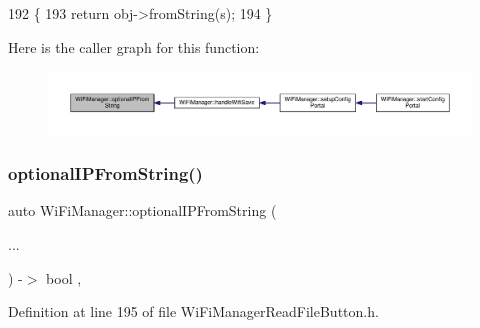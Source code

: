 \begin{DoxyCode}
192                                                                                          \{
193       \textcolor{keywordflow}{return}  obj->fromString(s);
194     \}
\end{DoxyCode}
Here is the caller graph for this function\+:\nopagebreak
\begin{figure}[H]
\begin{center}
\leavevmode
\includegraphics[width=350pt]{d4/dc8/class_wi_fi_manager_a6a94f08eb43e0871932556a4ccfa11b7_icgraph}
\end{center}
\end{figure}
\mbox{\label{class_wi_fi_manager_aa248b818eee0423b14a88c637f7c4637}} 
\subsubsection{\texorpdfstring{optional\+I\+P\+From\+String()}{optionalIPFromString()}\hspace{0.1cm}{\footnotesize\ttfamily [2/2]}}
{\footnotesize\ttfamily auto Wi\+Fi\+Manager\+::optional\+I\+P\+From\+String (\begin{DoxyParamCaption}\item[{}]{... }\end{DoxyParamCaption}) -\/$>$ bool \hspace{0.3cm}{\ttfamily [inline]}, {\ttfamily [private]}}



Definition at line 195 of file Wi\+Fi\+Manager\+Read\+File\+Button.\+h.


